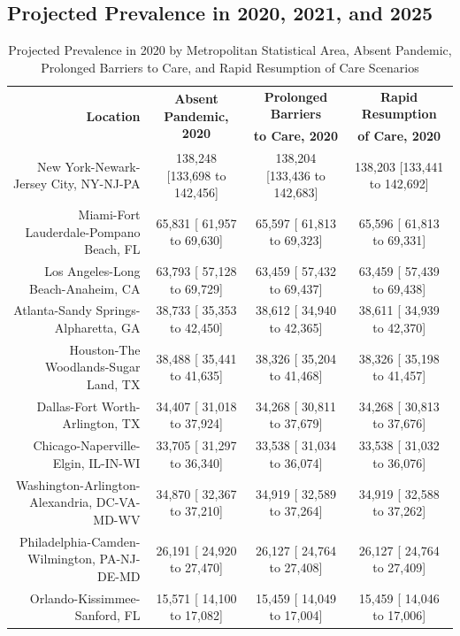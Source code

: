 \documentclass{article}
\begin{document}

\subsection{Projected Prevalence in 2020, 2021, and 2025}

\begin{table}[H]
	\caption{Projected Prevalence in 2020 by Metropolitan Statistical Area, Absent Pandemic, Prolonged Barriers to Care, and Rapid Resumption of Care Scenarios}
	\footnotesize
	\begin{tabular}{|r|c|c|c|}
		\hline
		\multirow{2}{*}{\textbf{Location}} & \multirow{2}{*}{\textbf{Absent Pandemic, 2020}} & \textbf{Prolonged Barriers} & \textbf{Rapid Resumption}\\
		&  & \textbf{to Care, 2020} & \textbf{of Care, 2020}\\
		\hline\hline
		New York-Newark-Jersey City, NY-NJ-PA & 138,248 [133,698 to 142,456] & 138,204 [133,436 to 142,683] & 138,203 [133,441 to 142,692]\\
		Miami-Fort Lauderdale-Pompano Beach, FL &  65,831 [ 61,957 to  69,630] &  65,597 [ 61,813 to  69,323] &  65,596 [ 61,813 to  69,331]\\
		Los Angeles-Long Beach-Anaheim, CA &  63,793 [ 57,128 to  69,729] &  63,459 [ 57,432 to  69,437] &  63,459 [ 57,439 to  69,438]\\
		Atlanta-Sandy Springs-Alpharetta, GA &  38,733 [ 35,353 to  42,450] &  38,612 [ 34,940 to  42,365] &  38,611 [ 34,939 to  42,370]\\
		Houston-The Woodlands-Sugar Land, TX &  38,488 [ 35,441 to  41,635] &  38,326 [ 35,204 to  41,468] &  38,326 [ 35,198 to  41,457]\\
		Dallas-Fort Worth-Arlington, TX &  34,407 [ 31,018 to  37,924] &  34,268 [ 30,811 to  37,679] &  34,268 [ 30,813 to  37,676]\\
		Chicago-Naperville-Elgin, IL-IN-WI &  33,705 [ 31,297 to  36,340] &  33,538 [ 31,034 to  36,074] &  33,538 [ 31,032 to  36,076]\\
		Washington-Arlington-Alexandria, DC-VA-MD-WV &  34,870 [ 32,367 to  37,210] &  34,919 [ 32,589 to  37,264] &  34,919 [ 32,588 to  37,262]\\
		Philadelphia-Camden-Wilmington, PA-NJ-DE-MD &  26,191 [ 24,920 to  27,470] &  26,127 [ 24,764 to  27,408] &  26,127 [ 24,764 to  27,409]\\
		Orlando-Kissimmee-Sanford, FL &  15,571 [ 14,100 to  17,082] &  15,459 [ 14,049 to  17,004] &  15,459 [ 14,046 to  17,006]\\

\end{tabular}
\end{table}
\end{document}

